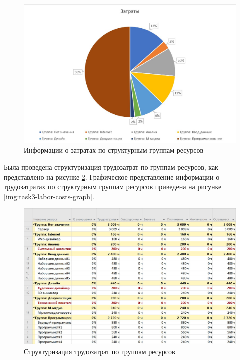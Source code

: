 \begin{figure}[H]
	\begin{center}
		\includegraphics[scale=0.5]{inc/img/task3-costs-graph.jpg}
	\end{center}
	\captionsetup{justification=centering}
	\caption{Информации о затратах по структурным группам ресурсов}
	\label{img:task3-costs-graph}
\end{figure}

Была проведена структуризация трудозатрат по группам ресурсов, как представлено на рисунке \ref{img:task3-labor-costs}. Графическое представление информации о трудозатратах по структурным группам ресурсов приведена на рисунке \ref{img:task3-labor-costs-graph}.

\begin{figure}[H]
	\begin{center}
		\includegraphics[scale=0.4]{inc/img/task3-labor-costs.jpg}
	\end{center}
	\captionsetup{justification=centering}
	\caption{Структуризация трудозатрат по группам ресурсов}
	\label{img:task3-labor-costs}
\end{figure}

